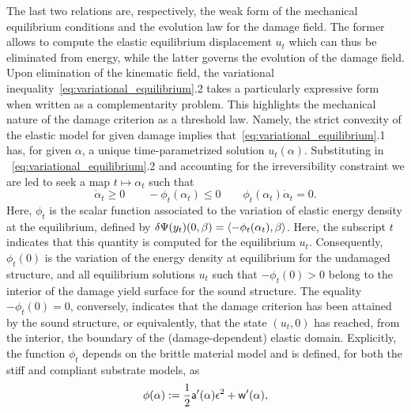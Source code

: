 The last two relations are, respectively, the weak form of the mechanical equilibrium conditions and the  evolution law  for the damage field.
The former allows to compute the elastic equilibrium displacement $u_t$ which can thus be eliminated from energy, while the latter governs the evolution of the damage field.
Upon elimination of the kinematic field, the variational inequality~\eqref{eq:variational_equilibrium}.2 takes a particularly expressive form when written as a complementarity problem. This highlights the mechanical nature of the damage criterion as a threshold law.
Namely, the strict convexity of the elastic model for given damage implies that~\eqref{eq:variational_equilibrium}.1 has, for given $\alpha$, a unique time-parametrized solution $u_t(\alpha)$. 
Substituting in ~\eqref{eq:variational_equilibrium}.2 and accounting for the irreversibility constraint we are led to seek a map $t\mapsto\alpha_t$ such that 
    \begin{equation}
    \label{eq:complementarity}
    \dot \alpha_t \geq 0 \qquad 
     -\phi_t(\alpha_t) \leq 0 \qquad
     \phi_t(\alpha_t)\dot \alpha_t = 0.
\end{equation}
Here, $\phi_t$ is the scalar function associated to the variation of elastic energy density at the equilibrium, defined by $\delta \Psi(y_t)(0, \beta) = \langle -\phi_t(\alpha_t), \beta\rangle$. Here, the subscript $t$ indicates that this quantity is computed for the equilibrium $u_t$.
Consequently, $\phi_t(0)$ is 
the variation of the  energy density at equilibrium for the undamaged structure, and all equilibrium solutions $u_t$ such that $-\phi_t(0) > 0$ belong to the interior of the damage yield surface for the sound structure. The equality $-\phi_t(0) = 0$, conversely, indicates that the damage criterion has been attained by the sound structure, or equivalently, that the state $(u_t, 0)$ has reached, from the interior, the boundary of the (damage-dependent) elastic domain. 
% 
% 
% 
Explicitly, the function $\phi_t$ depends on the brittle material model and is defined, for both the stiff and compliant substrate models, as
\begin{equation}
    \label{eq:energy_release_rate}
    \phi(\alpha) := \frac{1}{2}\mathsf{a}'(\alpha)\epsilon^2 + \mathsf{w}'(\alpha),
\end{equation}
